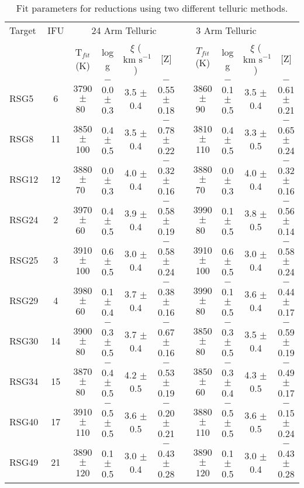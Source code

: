\documentclass[iop]{emulateapj}
\def\kms{$\mbox{km s}^{-1}$}
\def\pp{$\phantom{-}$}
\def\o{$\phantom{0}$}
\begin{document}
\begin{table*}
\begin{center}
\caption{
Fit parameters for reductions using two different telluric methods.
\label{tb:stellar-params}
         }
\scriptsize
\begin{tabular}{lc cccc c cccc}
 \hline
 \hline
  Target  & IFU &  \multicolumn{4}{c}{24 Arm Telluric} & \multicolumn{4}{c}{3 Arm Telluric}\\
  \cline{3-6}  \cline{8-11}
 &  & T$_{fit}$ (K) & log g & $\xi$ (\kms) & [Z] & & $T_{fit}$ (K) & log g & $\xi$ (\kms) & [Z]\\
  \hline
RSG5  & 6 & 3790 $\pm$ 80\o & $-$0.0 $\pm$ 0.3 & 3.5 $\pm$ 0.4 & $-$0.55 $\pm$ 0.18 & & 3860 $\pm$ 90\o & $-$0.1 $\pm$ 0.5 &  3.5 $\pm$ 0.4 & $-$0.61 $\pm$ 0.21 \\
RSG8  & 11& 3850 $\pm$ 100  & \pp0.4 $\pm$ 0.5 & 3.5 $\pm$ 0.4 & $-$0.78 $\pm$ 0.22 & & 3810 $\pm$ 110  & \pp0.4 $\pm$ 0.5 &  3.3 $\pm$ 0.5 & $-$0.65 $\pm$ 0.24 \\
RSG12 & 12& 3880 $\pm$ 70\o & \pp0.0 $\pm$ 0.3 & 4.0 $\pm$ 0.4 & $-$0.32 $\pm$ 0.16 & & 3880 $\pm$ 70\o & \pp0.0 $\pm$ 0.3 &  4.0 $\pm$ 0.4 & $-$0.32 $\pm$ 0.16 \\
RSG24 & 2 & 3970 $\pm$ 60\o & \pp0.4 $\pm$ 0.5 & 3.9 $\pm$ 0.4 & $-$0.58 $\pm$ 0.19 & & 3990 $\pm$ 80\o & \pp0.1 $\pm$ 0.5 &  3.8 $\pm$ 0.5 & $-$0.56 $\pm$ 0.14 \\
RSG25 & 3 & 3910 $\pm$ 100  & \pp0.6 $\pm$ 0.5 & 3.0 $\pm$ 0.4 & $-$0.58 $\pm$ 0.24 & & 3910 $\pm$ 100  & \pp0.6 $\pm$ 0.5 &  3.0 $\pm$ 0.4 & $-$0.58 $\pm$ 0.24 \\
RSG29 & 4 & 3980 $\pm$ 60\o & \pp0.1 $\pm$ 0.4 & 3.7 $\pm$ 0.4 & $-$0.38 $\pm$ 0.16 & & 3990 $\pm$ 80\o & $-$0.1 $\pm$ 0.5 &  3.6 $\pm$ 0.4 & $-$0.44 $\pm$ 0.17 \\
RSG30 & 14& 3900 $\pm$ 80\o & $-$0.3 $\pm$ 0.5 & 3.7 $\pm$ 0.4 & $-$0.67 $\pm$ 0.16 & & 3850 $\pm$ 80\o & $-$0.3 $\pm$ 0.5 &  3.5 $\pm$ 0.4 & $-$0.59 $\pm$ 0.19 \\
RSG34 & 15& 3870 $\pm$ 80\o & $-$0.4 $\pm$ 0.5 & 4.2 $\pm$ 0.5 & $-$0.53 $\pm$ 0.19 & & 3850 $\pm$ 60\o & $-$0.3 $\pm$ 0.4 &  4.3 $\pm$ 0.5 & $-$0.49 $\pm$ 0.17 \\
RSG40 & 17& 3910 $\pm$ 110  & $-$0.5 $\pm$ 0.5 & 3.6 $\pm$ 0.5 & $-$0.20 $\pm$ 0.21 & & 3880 $\pm$ 110  & $-$0.5 $\pm$ 0.5 &  3.6 $\pm$ 0.5 & $-$0.15 $\pm$ 0.24 \\
RSG49 & 21& 3890 $\pm$ 120  & \pp0.1 $\pm$ 0.5 & 3.0 $\pm$ 0.4 & $-$0.43 $\pm$ 0.28 & & 3890 $\pm$ 120  & \pp0.1 $\pm$ 0.5 &  3.0 $\pm$ 0.4 & $-$0.43 $\pm$ 0.28 \\

\end{tabular}
\end{center}
\end{table*}
\end{document}
